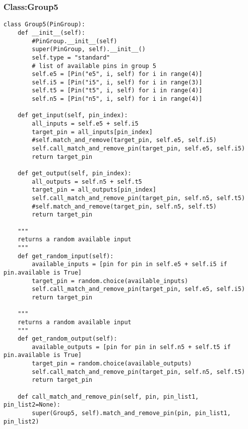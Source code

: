 \documentclass[a4paper]{article}
\begin{document}
\subsubsection{Class:Group5}
\label{sec-4-5-5}
\begin{verbatim}
class Group5(PinGroup):
    def __init__(self):
        #PinGroup.__init__(self)
        super(PinGroup, self).__init__()
        self.type = "standard"
        # list of available pins in group 5
        self.e5 = [Pin("e5", i, self) for i in range(4)]
        self.i5 = [Pin("i5", i, self) for i in range(3)]
        self.t5 = [Pin("t5", i, self) for i in range(4)]
        self.n5 = [Pin("n5", i, self) for i in range(4)]

    def get_input(self, pin_index):
        all_inputs = self.e5 + self.i5
        target_pin = all_inputs[pin_index]
        #self.match_and_remove(target_pin, self.e5, self.i5)
        self.call_match_and_remove_pin(target_pin, self.e5, self.i5)
        return target_pin

    def get_output(self, pin_index):
        all_outputs = self.n5 + self.t5
        target_pin = all_outputs[pin_index]
        self.call_match_and_remove_pin(target_pin, self.n5, self.t5)
        #self.match_and_remove(target_pin, self.n5, self.t5)
        return target_pin

    """
    returns a random available input
    """
    def get_random_input(self):
        available_inputs = [pin for pin in self.e5 + self.i5 if pin.available is True]
        target_pin = random.choice(available_inputs)
        self.call_match_and_remove_pin(target_pin, self.e5, self.i5)
        return target_pin

    """
    returns a random available input
    """
    def get_random_output(self):
        available_outputs = [pin for pin in self.n5 + self.t5 if pin.available is True]
        target_pin = random.choice(available_outputs)
        self.call_match_and_remove_pin(target_pin, self.n5, self.t5)
        return target_pin

    def call_match_and_remove_pin(self, pin, pin_list1, pin_list2=None):
        super(Group5, self).match_and_remove_pin(pin, pin_list1, pin_list2)
\end{verbatim}
\end{document}
